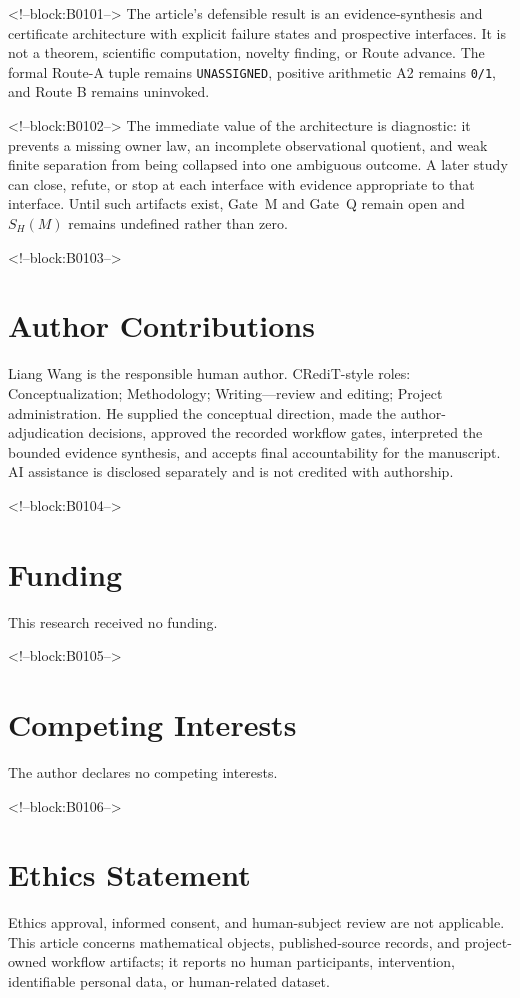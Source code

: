 \documentclass[11pt,a4paper]{article}
\begin{document}
<!--block:B0101-->
The article's defensible result is an evidence-synthesis and certificate architecture with explicit failure states and prospective interfaces. It is not a theorem, scientific computation, novelty finding, or Route advance. The formal Route-A tuple remains \texttt{UNASSIGNED}, positive arithmetic A2 remains \texttt{0/1}, and Route B remains uninvoked.

<!--block:B0102-->
The immediate value of the architecture is diagnostic: it prevents a missing owner law, an incomplete observational quotient, and weak finite separation from being collapsed into one ambiguous outcome. A later study can close, refute, or stop at each interface with evidence appropriate to that interface. Until such artifacts exist, Gate~M and Gate~Q remain open and \(S_H(M)\) remains undefined rather than zero.

<!--block:B0103-->
\section*{Author Contributions}
Liang Wang is the responsible human author. CRediT-style roles: Conceptualization; Methodology; Writing---review and editing; Project administration. He supplied the conceptual direction, made the author-adjudication decisions, approved the recorded workflow gates, interpreted the bounded evidence synthesis, and accepts final accountability for the manuscript. AI assistance is disclosed separately and is not credited with authorship.

<!--block:B0104-->
\section*{Funding}
This research received no funding.

<!--block:B0105-->
\section*{Competing Interests}
The author declares no competing interests.

<!--block:B0106-->
\section*{Ethics Statement}
Ethics approval, informed consent, and human-subject review are not applicable. This article concerns mathematical objects, published-source records, and project-owned workflow artifacts; it reports no human participants, intervention, identifiable personal data, or human-related dataset.
\end{document}
